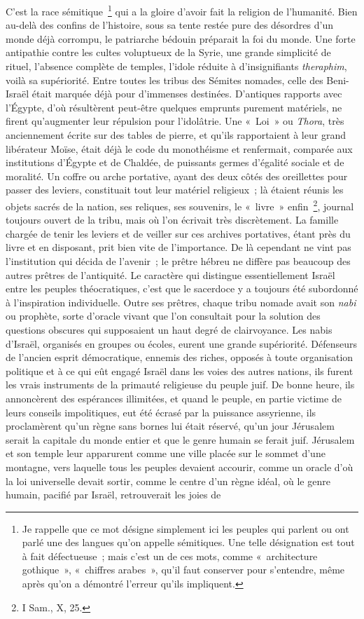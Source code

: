 \documentclass[french,twoside]{book} %
\begin{document}
C’est la race sémitique \footnote{Je rappelle que ce mot désigne simplement ici les peuples qui parlent ou ont parlé une des langues qu’on appelle sémitiques. Une telle désignation est tout à fait défectueuse ; mais c’est un de ces mots, comme « architecture gothique », « chiffres arabes », qu’il faut conserver pour s’entendre, même après qu’on a démontré l’erreur qu’ils impliquent.} qui a la gloire d’avoir fait la religion de l’humanité. Bien au-delà des confins de l’histoire, sous sa tente restée pure des désordres d’un monde déjà corrompu, le patriarche bédouin préparait la foi du monde. Une forte antipathie contre les cultes voluptueux de la Syrie, une grande simplicité de rituel, l’absence complète de temples, l’idole réduite à d’insignifiants {\itshape theraphim}, voilà sa supériorité. Entre toutes les tribus des Sémites nomades, celle des Beni-Israël était marquée déjà pour d’immenses destinées. D’antiques rapports avec l’Égypte, d’où résultèrent peut-être quelques emprunts purement matériels, ne firent qu’augmenter leur répulsion pour l’idolâtrie. Une « Loi » ou {\itshape Thora}, très anciennement écrite sur des tables de pierre, et qu’ils rapportaient à leur grand libérateur Moïse, était déjà le code du monothéisme et renfermait, comparée aux institutions d’Égypte et de Chaldée, de puissants germes d’égalité sociale et de moralité. Un coffre ou arche portative, ayant des deux côtés des oreillettes pour passer des leviers, constituait tout leur matériel religieux ; là étaient réunis les objets sacrés de la nation, ses reliques, ses souvenirs, le « livre » enfin \footnote{I Sam., X, 25.}, journal toujours ouvert de la tribu, mais où l’on écrivait très discrètement. La famille chargée de tenir les leviers et de veiller sur ces archives portatives, étant près du livre et en disposant, prit bien vite de l’importance. De là cependant ne vint pas l’institution qui décida de l’avenir ; le prêtre hébreu ne diffère pas beaucoup des autres prêtres de l’antiquité. Le caractère qui distingue essentiellement Israël entre les peuples théocratiques, c’est que le sacerdoce y a toujours été subordonné à l’inspiration individuelle. Outre ses prêtres, chaque tribu nomade avait son {\itshape nabi} ou prophète, sorte d’oracle vivant que l’on consultait pour la solution des questions obscures qui supposaient un haut degré de clairvoyance. Les nabis d’Israël, organisés en groupes ou écoles, eurent une grande supériorité. Défenseurs de l’ancien esprit démocratique, ennemis des riches, opposés à toute organisation politique et à ce qui eût engagé Israël dans les voies des autres nations, ils furent les vrais instruments de la primauté religieuse du peuple juif. De bonne heure, ils annoncèrent des espérances illimitées, et quand le peuple, en partie victime de leurs conseils impolitiques, eut été écrasé par la puissance assyrienne, ils proclamèrent qu’un règne sans bornes lui était réservé, qu’un jour Jérusalem serait la capitale du monde entier et que le genre humain se ferait juif. Jérusalem et son temple leur apparurent comme une ville placée sur le sommet d’une montagne, vers laquelle tous les peuples devaient accourir, comme un oracle d’où la loi universelle devait sortir, comme le centre d’un règne idéal, où le genre humain, pacifié par Israël, retrouverait les joies de 
\end{document}
